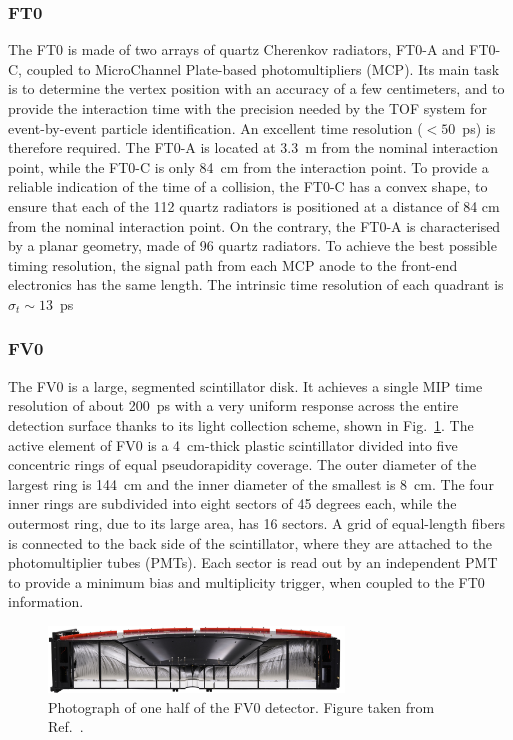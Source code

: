 \subsubsection{FT0}

The FT0 is made of two arrays of quartz Cherenkov radiators, FT0-A and FT0-C, coupled to MicroChannel Plate-based photomultipliers (MCP). Its main task is to determine the vertex position with an accuracy of a few centimeters, and to provide the interaction time with the precision needed by the TOF system for event-by-event particle identification. An excellent time resolution ($<50$~ps) is therefore required. The FT0-A is located at 3.3~m from the nominal interaction point, while the FT0-C is only 84~cm from the interaction point. To provide a reliable indication of the time of a collision, the FT0-C has a convex shape, to ensure that each of the 112 quartz radiators is positioned at a distance of 84 cm from the nominal interaction point. On the contrary, the FT0-A is characterised by a planar geometry, made of 96 quartz radiators. To achieve the best possible timing resolution, the signal path from each MCP anode to the front-end electronics has the same length. The intrinsic time resolution of each quadrant is $\sigma_t \sim 13$~ps

\subsubsection{FV0}
The FV0 is a large, segmented scintillator disk. It achieves a single MIP time resolution of about 200~ps with a very uniform response across the entire detection surface thanks to its light collection scheme, shown in Fig.~\ref{fig:FV0}. The active element of FV0 is a 4~cm-thick plastic scintillator divided into five concentric rings of equal pseudorapidity coverage. The outer diameter of the largest ring is 144~cm and the inner diameter of the smallest is 8~cm. The four inner rings are subdivided into eight sectors of 45 degrees each, while the outermost ring, due to its large area, has 16 sectors. A grid of equal-length fibers is connected to the back side of the scintillator, where they are attached to the photomultiplier tubes (PMTs). Each sector is read out by an independent PMT to provide a minimum bias and multiplicity trigger, when coupled to the FT0 information.

\begin{figure}[htb]
    \centering
    \includegraphics[width=0.7\textwidth]{Figures/Chapter 3/FV0_Scheme.jpg}
    \caption{Photograph of one half of the FV0 detector. Figure taken from Ref.~\cite{ALICE:2023udb}.}
    \label{fig:FV0}
\end{figure}

